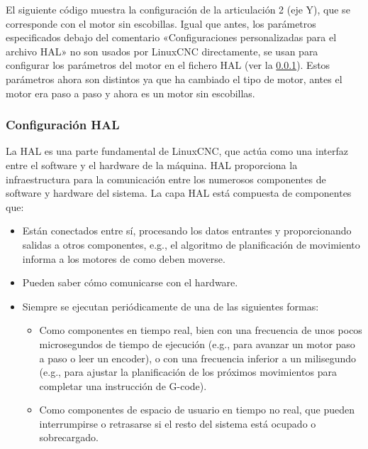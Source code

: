\documentclass[english,spanish,a4paper,11pt]{article}
\begin{document}
\begin{itemize}
    El siguiente código muestra la configuración de la articulación 2 (eje Y), que se corresponde con el motor sin escobillas. Igual que antes, los parámetros especificados debajo del comentario «Configuraciones personalizadas para el archivo HAL» no son usados por LinuxCNC directamente, se usan para configurar los parámetros del motor en el fichero HAL (ver la \cref{sec:linuxcnc_configuration_hal}). Estos parámetros ahora son distintos ya que ha cambiado el tipo de motor, antes el motor era paso a paso y ahora es un motor sin escobillas.

\end{itemize}


\subsubsection{Configuración HAL}
\label{sec:linuxcnc_configuration_hal}

La \acf{HAL} es una parte fundamental de LinuxCNC, que actúa como una interfaz entre el software y el hardware de la máquina. \ac{HAL} proporciona la infraestructura para la comunicación entre los numerosos componentes de software y hardware del sistema. La capa \ac{HAL} está compuesta de componentes que:
\begin{itemize}
    \item Están conectados entre sí, procesando los datos entrantes y proporcionando salidas a otros componentes, e.g., el algoritmo de planificación de movimiento informa a los motores de como deben moverse.
    \item Pueden saber cómo comunicarse con el hardware.
    \item Siempre se ejecutan periódicamente de una de las siguientes formas:
    \begin{itemize}
        \item Como componentes en tiempo real, bien con una frecuencia de unos pocos microsegundos de tiempo de ejecución (e.g., para avanzar un motor paso a paso o leer un encoder), o con una frecuencia inferior a un milisegundo (e.g., para ajustar la planificación de los próximos movimientos para completar una instrucción de G-code).

        \item Como componentes de espacio de usuario en tiempo no real, que pueden interrumpirse o retrasarse si el resto del sistema está ocupado o sobrecargado.
    \end{itemize}
\end{itemize}
\end{document}
